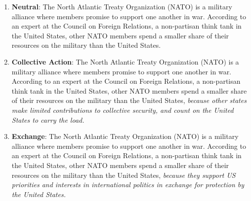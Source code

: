 \documentclass[12pt]{article}
\begin{document}
 
\begin{enumerate}

\item \textbf{Neutral}: The North Atlantic Treaty Organization (NATO) is a military alliance where members promise to support one another in war. According to an expert at the Council on Foreign Relations, a non-partisan think tank in the United States, other NATO members spend a smaller share of their resources on the military than the United States. 

\item \textbf{Collective Action}:  The North Atlantic Treaty Organization (NATO) is a military alliance where members promise to support one another in war. According to an expert at the Council on Foreign Relations, a non-partisan think tank in the United States, other NATO members spend a smaller share of their resources on the military than the United States, \textit{because other states make limited contributions to collective security, and count on the United States to carry the load.} %

\item \textbf{Exchange}: The North Atlantic Treaty Organization (NATO) is a military alliance where members promise to support one another in war. According to an expert at the Council on Foreign Relations, a non-partisan think tank in the United States, other NATO members spend a smaller share of their resources on the military than the United States, \textit{because they support US priorities and interests in international politics in exchange for protection by the United States.}
 
\end{enumerate}  
\end{document}
